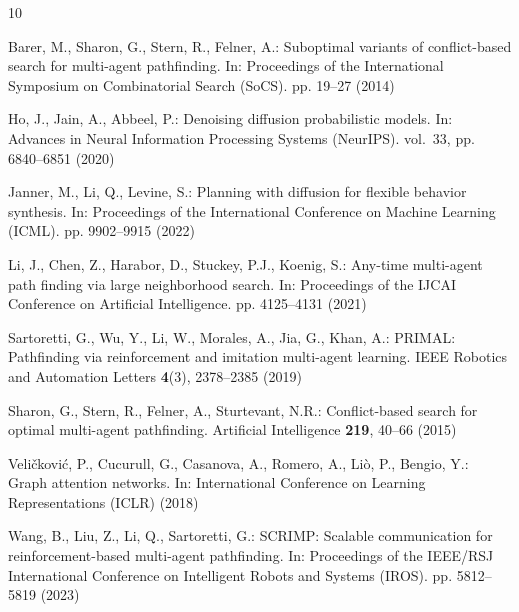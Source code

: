 \documentclass[runningheads]{llncs}
\begin{document}
\begin{thebibliography}{10}
\providecommand{\url}[1]{\texttt{#1}}
\providecommand{\urlprefix}{URL }

Barer, M., Sharon, G., Stern, R., Felner, A.: Suboptimal variants of conflict-based search for multi-agent pathfinding. In: Proceedings of the International Symposium on Combinatorial Search (SoCS). pp. 19--27 (2014)

Ho, J., Jain, A., Abbeel, P.: Denoising diffusion probabilistic models. In: Advances in Neural Information Processing Systems (NeurIPS). vol.~33, pp. 6840--6851 (2020)

Janner, M., Li, Q., Levine, S.: Planning with diffusion for flexible behavior synthesis. In: Proceedings of the International Conference on Machine Learning (ICML). pp. 9902--9915 (2022)

Li, J., Chen, Z., Harabor, D., Stuckey, P.J., Koenig, S.: Any-time multi-agent path finding via large neighborhood search. In: Proceedings of the IJCAI Conference on Artificial Intelligence. pp. 4125--4131 (2021)

Sartoretti, G., Wu, Y., Li, W., Morales, A., Jia, G., Khan, A.: PRIMAL: Pathfinding via reinforcement and imitation multi-agent learning. IEEE Robotics and Automation Letters \textbf{4}(3), 2378--2385 (2019)

Sharon, G., Stern, R., Felner, A., Sturtevant, N.R.: Conflict-based search for optimal multi-agent pathfinding. Artificial Intelligence \textbf{219}, 40--66 (2015)

Veli\v{c}kovi\'{c}, P., Cucurull, G., Casanova, A., Romero, A., Li\`{o}, P., Bengio, Y.: Graph attention networks. In: International Conference on Learning Representations (ICLR) (2018)

Wang, B., Liu, Z., Li, Q., Sartoretti, G.: SCRIMP: Scalable communication for reinforcement-based multi-agent pathfinding. In: Proceedings of the IEEE/RSJ International Conference on Intelligent Robots and Systems (IROS). pp. 5812--5819 (2023)

\end{thebibliography}
\end{document}
